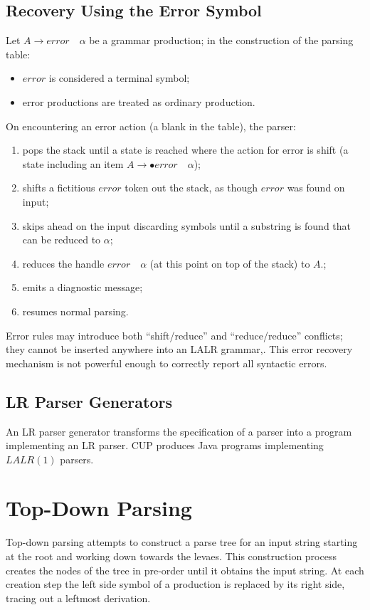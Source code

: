 \subsection{Recovery Using the Error Symbol}
Let $A \to error \quad \alpha$ be a grammar production; in the construction of the parsing table:
\begin{itemize}
	\item $error$ is considered a terminal symbol;
	\item error productions are treated as ordinary production.
\end{itemize}
On encountering an error action (a blank in the table), the parser:
\begin{enumerate}
	\item pops the stack until a state is reached where the action for error is shift (a state including an item $A \to \bullet error \quad \alpha$);
	\item shifts a fictitious $error$ token out the stack, as though $error$ was found on input;
	\item skips ahead on the input discarding symbols until a substring is found that can be reduced to $\alpha$;
	\item reduces the handle $error \quad \alpha$ (at this point on top of the stack) to $A$.;
	\item emits a diagnostic message;
	\item resumes normal parsing.
\end{enumerate}
Error rules may introduce both ``shift/reduce'' and ``reduce/reduce'' conflicts; they cannot be inserted anywhere into an LALR grammar,.
This error recovery mechanism is not powerful enough to correctly report all syntactic errors.

\subsection{LR Parser Generators}
An LR parser generator transforms the specification of a parser into a program implementing an LR parser.
CUP produces Java programs implementing $LALR(1)$ parsers.

\section{Top-Down Parsing}
Top-down parsing attempts to construct a parse tree for an input string starting at the root and working down towards the levaes.
This construction process creates the nodes of the tree in pre-order until it obtains the input string.
At each creation step the left side symbol of a production is replaced by its right side, tracing out a leftmost derivation.

